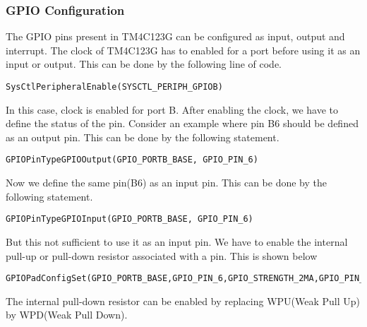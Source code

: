 \documentclass[a4paper,10pt,oneside]{article}
\begin{document}
{			\subsubsection{\textbf{GPIO Configuration}}
				{The GPIO pins present in TM4C123G can be configured as input, output and interrupt. The clock of TM4C123G has to enabled for a port before using it as an input or output. This can be done by the following line of code.
				\begin{lstlisting}[style=CStyle]
					SysCtlPeripheralEnable(SYSCTL_PERIPH_GPIOB)  \end{lstlisting}
				In this case, clock is enabled for port B. After enabling the clock, we have to define the status of the pin. Consider an example where pin B6 should be defined as an output pin. This can be done by the following statement.
				\begin{lstlisting}[style=CStyle]
				GPIOPinTypeGPIOOutput(GPIO_PORTB_BASE, GPIO_PIN_6)  \end{lstlisting}
				Now we define the same pin(B6) as an input pin. This can be done by the following statement. 
				\begin{lstlisting}[style=CStyle]
				GPIOPinTypeGPIOInput(GPIO_PORTB_BASE, GPIO_PIN_6)  \end{lstlisting}
				But this not sufficient to use it as an input pin. We have to enable the internal pull-up or pull-down resistor associated with a pin. This is shown below
								\begin{lstlisting}[style=CStyle]
				GPIOPadConfigSet(GPIO_PORTB_BASE,GPIO_PIN_6,GPIO_STRENGTH_2MA,GPIO_PIN_TYPE_STD_WPU)  \end{lstlisting}
				The internal pull-down resistor can be enabled by replacing WPU(Weak Pull Up) by WPD(Weak Pull Down).
			}
}
\end{document}
